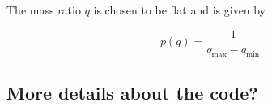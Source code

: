 \documentclass[a4paper,fleqn,usenatbib]{mnras}
\begin{document}
The mass ratio $q$ is chosen to be flat and is given by

\begin{equation}
    p(q) =  \frac{1}{q_{\text{max}} - q_{\text{min}}} 
	\label{eq:prior-massratio}
\end{equation}



\subsection{More details about the code? }


%
%
\end{document}
